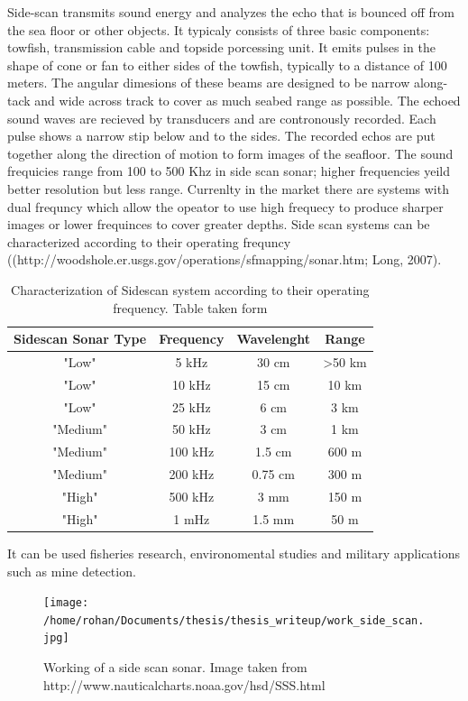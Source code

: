 \documentclass[12pt,draft]{dalcsthesis}
\begin{document}
{{Side-scan transmits sound energy and analyzes the echo that is bounced off from the sea floor or other objects. It typicaly consists of three basic components: towfish, transmission cable and topside porcessing unit. It emits pulses in the shape of cone or fan to either sides of the towfish, typically to a distance of 100 meters. The angular dimesions of these beams are designed to be narrow along-tack and wide across track to cover as much seabed range as possible.  The echoed sound waves are recieved by transducers and are contronously recorded. Each pulse shows a narrow stip below and to the sides.  The recorded echos are put together along the direction of motion to form images of the seafloor. The sound frequicies range from 100 to 500 Khz in side scan sonar; higher frequencies yeild better resolution but less range. Currenlty in the market there are systems with dual frequncy which allow the opeator to use high frequecy to produce sharper images or lower frequinces to cover greater depths. Side scan systems can be characterized according to their operating frequncy ((http://woodshole.er.usgs.gov/operations/sfmapping/sonar.htm; Long, 2007).

\begin{table}

\begin{tabular}{|c|c|c|c|}
\hline 
Sidescan Sonar Type & Frequency & Wavelenght & Range \\ 
\hline 
"Low" & 5 kHz & 30 cm & >50 km \\ 
\hline 
"Low" & 10 kHz & 15 cm & 10 km \\ 
\hline 
"Low" & 25 kHz & 6 cm & 3 km \\ 
\hline 
"Medium" & 50 kHz & 3 cm & 1 km \\ 
\hline 
"Medium" & 100 kHz & 1.5 cm & 600 m \\ 
\hline 
"Medium" & 200 kHz & 0.75 cm & 300 m \\ 
\hline 
"High" & 500 kHz & 3 mm & 150 m \\ 
\hline 
"High" & 1 mHz & 1.5 mm & 50 m \\ 
\hline 
\end{tabular} 
\caption{\label{tab-: classification of side scan} Characterization of Sidescan system according to their operating frequency. Table taken form \cite{Menezes}} 
\end{table}
It can be used fisheries research, environomental studies and military applications such as mine detection. 

\begin{figure}
  \centering
     {\texttt{[image: /home/rohan/Documents/thesis/thesis\_writeup/work\_side\_scan.jpg]}}
  \caption{\label{fig- side scan sonar working} Working of a side scan sonar. Image taken from \cite{}{http://www.nauticalcharts.noaa.gov/hsd/SSS.html} }
\end{figure}


}}
\end{document}
